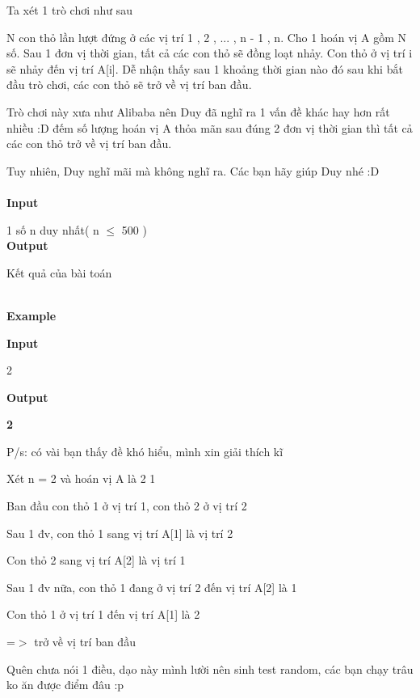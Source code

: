 



    Ta xét 1 trò chơi như sau   

    N con thỏ lần lượt đứng ở các vị trí 1 , 2 , ... , n - 1 , n. Cho 1 hoán vị A gồm N số. Sau 1 đơn vị thời gian, tất cả các con thỏ sẽ đồng loạt nhảy. Con thỏ ở vị trí i sẽ nhảy đến vị trí A[i]. Dễ nhận thấy sau 1 khoảng thời gian nào đó sau khi bắt đầu trò chơi, các con thỏ sẽ trở về vị trí ban đầu.   

    Trò chơi này xưa như Alibaba nên Duy đã nghĩ ra 1 vấn đề khác hay hơn rất nhiều :D đếm số lượng hoán vị A thỏa mãn sau đúng 2 đơn vị thời gian thì tất cả các con thỏ trở về vị trí ban đầu.   

    Tuy nhiên, Duy nghĩ mãi mà không nghĩ ra. Các bạn hãy giúp Duy nhé :D    
\\


\\

\textbf{     Input    }

    1 số n duy nhất( n  $\le$  500 )    
\\

\textbf{     Output    }

    Kết quả của bài toán   


\\

\textbf{     Example    }

\textbf{     Input    }

    2   

\textbf{     Output    }

\textbf{     2    }



    P/s: có vài bạn thấy đề khó hiểu, mình xin giải thích kĩ   

    Xét n = 2 và hoán vị A là 2 1   

    Ban đầu con thỏ 1 ở vị trí 1, con thỏ 2 ở vị trí 2   

    Sau 1 đv, con thỏ 1 sang vị trí A[1] là vị trí 2   

    Con thỏ 2 sang vị trí A[2] là vị trí 1   

    Sau 1 đv nữa, con thỏ 1 đang ở vị trí 2 đến vị trí A[2] là 1   

    Con thỏ 1 ở vị trí 1 đến vị trí A[1] là 2   

    =$>$ trở về vị trí ban đầu   

    Quên chưa nói 1 điều, dạo này mình lười nên sinh test random, các bạn chạy trâu ko ăn được điểm đâu :p    
\\
